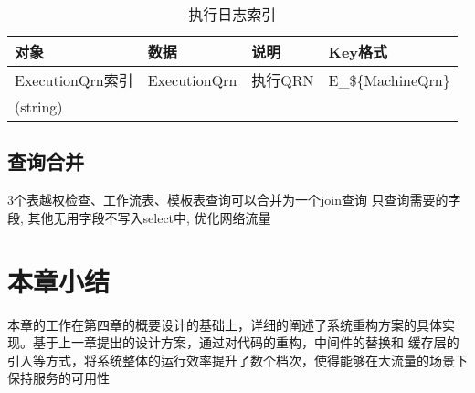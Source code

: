     \begin{table}[H]
        \centering
        \caption{执行日志索引}
        \label{tab:key-log-index}
        \begin{tabular}{lp{10em}ll}
            \toprule
            对象   & 数据               & 说明 & Key格式 \\
            \midrule
            ExecutionQrn索引 & ExecutionQrn    & 执行QRN    & E\_\$\{MachineQrn\} \\
            (string) &&& \\
            \bottomrule
        \end{tabular}
    \end{table}

\subsection{查询合并}
3个表越权检查、工作流表、模板表查询可以合并为一个join查询
只查询需要的字段, 其他无用字段不写入select中, 优化网络流量


\section{本章小结}
本章的工作在第四章的概要设计的基础上，详细的阐述了系统重构方案的具体实现。基于上一章提出的设计方案，通过对代码的重构，中间件的替换和
缓存层的引入等方式，将系统整体的运行效率提升了数个档次，使得能够在大流量的场景下保持服务的可用性